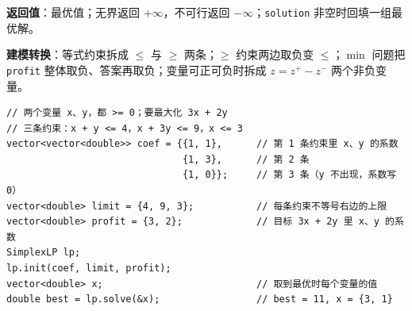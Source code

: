 		\textbf{返回值}：最优值；无界返回 $+\infty$，不可行返回 $-\infty$；\texttt{solution} 非空时回填一组最优解。

		\textbf{建模转换}：等式约束拆成 $\le$ 与 $\ge$ 两条；$\ge$ 约束两边取负变 $\le$；$\min$ 问题把 \texttt{profit} 整体取负、答案再取负；变量可正可负时拆成 $z = z^{+} - z^{-}$ 两个非负变量。

		\begin{verbatim}
// 两个变量 x、y，都 >= 0；要最大化 3x + 2y
// 三条约束：x + y <= 4，x + 3y <= 9，x <= 3
vector<vector<double>> coef = {{1, 1},      // 第 1 条约束里 x、y 的系数
                               {1, 3},      // 第 2 条
                               {1, 0}};     // 第 3 条（y 不出现，系数写 0）
vector<double> limit = {4, 9, 3};           // 每条约束不等号右边的上限
vector<double> profit = {3, 2};             // 目标 3x + 2y 里 x、y 的系数
SimplexLP lp;
lp.init(coef, limit, profit);
vector<double> x;                           // 取到最优时每个变量的值
double best = lp.solve(&x);					// best = 11, x = {3, 1}
		\end{verbatim}

